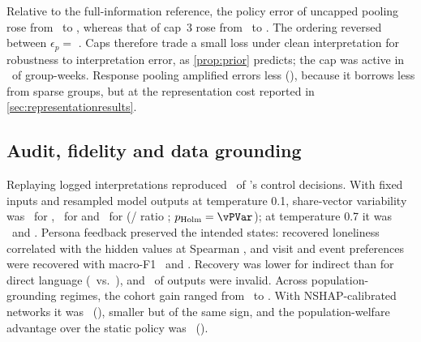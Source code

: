Relative to the full-information reference, the policy error of uncapped pooling rose from \vErrInfZero\ to \vErrInfHigh, whereas that of cap~3 rose from \vErrThreeZero\ to \vErrThreeHigh. The ordering reversed between $\epsilon_p=$ \vCrossEps. Caps therefore trade a small loss under clean interpretation for robustness to interpretation error, as \cref{prop:prior} predicts; the cap was active in \vCapActive\ of group-weeks. Response pooling amplified errors less (\vErrNaiveHigh), because it borrows less from sparse groups, but at the representation cost reported in \cref{sec:representationresults}.

\subsection{Audit, fidelity and data grounding}
\label{sec:checks}
Replaying logged interpretations reproduced \vReplay\ of 's control decisions. With fixed inputs and resampled model outputs at temperature 0.1, share-vector variability was \vVarLowSevenR\ for , \vVarLowEight\ for  and \vVarLowNine\ for  (/ ratio \vVarRatioLow; $p_{\mathrm{Holm}}=\vPVar$); at temperature 0.7 it was \vVarHighSevenR\ and \vVarHighEight. Persona feedback preserved the intended states: recovered loneliness correlated with the hidden values at Spearman \vFidRho, and visit and event preferences were recovered with macro-F1 \vFidVisit\ and \vFidEvent. Recovery was lower for indirect than for direct language (\vFidIndirect\ vs.\ \vFidDirect), and \vFidInvalid\ of outputs were invalid. Across population-grounding regimes, the cohort gain ranged from \vRegWsLo\ to \vRegWsHi. With NSHAP-calibrated networks it was \vRegNshapDWs\ (\vRegNshapDWsCI), smaller but of the same sign, and the population-welfare advantage over the static policy was \vRegNshapDWstat\ (\vRegNshapDWstatCI).
